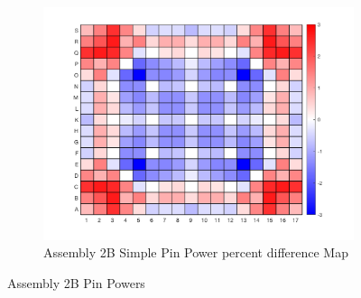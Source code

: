 \documentclass[12pt]{article}
\begin{document}
\begin{figure}[htb!]
        \label{fig:fig}
        \begin{subfigure}{\textwidth}
            \centering
            \includegraphics[scale=0.46]{Figures/2B_simple_pinpowerDiff.png}
            \caption{Assembly 2B Simple Pin Power percent difference Map}
            \label{fig:sub-firstA}
        \end{subfigure}
        \caption{Assembly 2B Pin Powers}
    \end{figure}
    
\newpage

\thispagestyle{empty}

\clearpage
\thispagestyle{empty}
\end{document}
